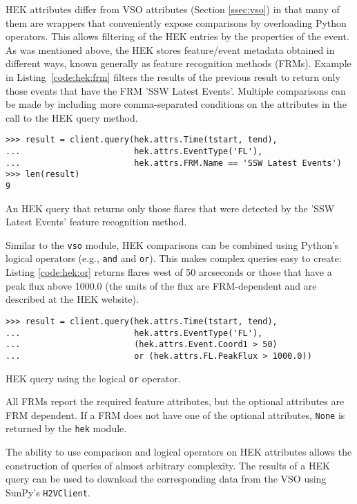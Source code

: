 HEK attributes differ from VSO attributes (Section \ref{ssec:vso}) in that many 
of them are wrappers that conveniently expose comparisons by overloading Python 
operators. This allows filtering of the HEK entries by the properties of the 
event. As was mentioned above, the HEK stores feature/event metadata obtained 
in different ways, known generally as feature recognition methods (FRMs). 
Example in Listing~\ref{code:hek:frm} filters the results of the previous 
result to return only those events that have the FRM 'SSW Latest Events'.  Multiple comparisons can be made by including more comma-separated
conditions on the attributes in the call to the HEK query method.

\begin{listing}[H]
\begin{verbatim}
>>> result = client.query(hek.attrs.Time(tstart, tend), 
...                       hek.attrs.EventType('FL'),
...                       hek.attrs.FRM.Name == 'SSW Latest Events')
>>> len(result)
9
\end{verbatim}
\caption{An HEK query that returns only those flares that were
  detected by the 'SSW Latest Events' feature recognition method.}
\label{code:hek:frm}
\end{listing}

Similar to the \texttt{vso} module, HEK comparisons can be combined using Python's logical operators (e.g., \texttt{and}
and \texttt{or}). This makes complex queries easy to create: Listing \ref{code:hek:or} 
returns flares west of 50 arcseconds or those that have a peak flux above 
1000.0 (the units of the flux are FRM-dependent and are described at the HEK 
website).
\begin{listing}[H]
\begin{verbatim}
>>> result = client.query(hek.attrs.Time(tstart, tend), 
...                       hek.attrs.EventType('FL'),
...                       (hek.attrs.Event.Coord1 > 50) 
...                       or (hek.attrs.FL.PeakFlux > 1000.0))
\end{verbatim}
\caption{HEK query using the logical \texttt{or} operator.}
\label{code:hek:or}
\end{listing}
All FRMs report the required feature attributes, but the optional attributes 
are FRM dependent.  If a FRM does not have one of the optional attributes, 
\texttt{None} is returned by the \texttt{hek} module. 

The ability to use comparison and logical operators on HEK attributes allows 
the construction of queries of almost arbitrary complexity. 
The results of a HEK query can be used to download the 
corresponding data from the VSO using SunPy's \texttt{H2VClient}.
